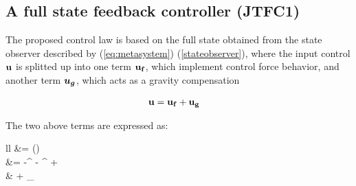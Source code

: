 	\subsection{A full state feedback controller (JTFC1)} \label{subsec:JTFC1}
	
	The proposed control law is based on the full state obtained from the state  observer described by (\ref{eq:metasystem})  (\ref{stateobserver}), where the input control $\mathbf{u}$ is splitted up into one term $\mathbf{u_f}$, which implement control force behavior, and another term ${ \boldsymbol {u_g}}$, which acts as a gravity compensation
	
	\begin{equation}
	\label{generic_control_law1}
	\begin{aligned}
	\vect{u} &= \vect{u_f} + \vect{u_g}
	\end{aligned}
	\end{equation}
	
The two above terms are expressed as:
	
	\setlength{\arraycolsep}{0.0em}
	
	\begin{IEEEeqnarray}{ll}
			\label{eq:JTCF1_control_law_uf_simple}
				 &= () \\
			 &=  -^{}
			- ^{} + 	\nonumber \\
			&     +
			_{}
			\label{eq:JTCF1_control_law_b}
		\end{IEEEeqnarray}
			
